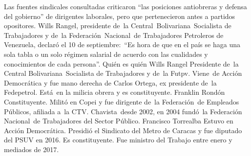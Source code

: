 \documentclass{article}%
\begin{document}
\newline%
%
Las fuentes sindicales consultadas criticaron “las posiciones antiobreras y defensa del gobierno” de dirigentes laborales, pero que pertenecieron antes a partidos opositores.%
\newline%
%
Wills Rangel, presidente de~la Central~Bolivariana~Socialista de Trabajadores y de~la Federación~Nacional~de Trabajadores Petroleros de Venezuela, declaró el 10 de septiembre:~“Es hora de que en el país se haga una sola tabla o un solo régimen salarial de acuerdo con las cualidades y conocimientos de cada persona”.%
\newline%
%
Quién es quién%
\newline%
%
Wills Rangel%
\newline%
%
Presidente de~la Central Bolivariana~Socialista de Trabajadores y de~la Futpv. Viene~de Acción Democrática y fue mano derecha de Carlos Ortega, ex presidente de~la Fedepetrol. Está~en la milicia obrera y es constituyente.%
\newline%
%
Franklin Rondón%
\newline%
%
Constituyente. Militó en Copei y fue dirigente de~la Federación~de Empleados Públicos, afiliada a~la CTV. Chavista~desde 2002, en 2004 fundó~la Federación Nacional~de Trabajadores del Sector Público.%
\newline%
%
Francisco Torrealba%
\newline%
%
Estuvo en Acción Democrática. Presidió el Sindicato del Metro de Caracas y fue diputado del PSUV en 2016. Es constituyente. Fue ministro del Trabajo entre enero y mediados de 2017.%
\newline%
%
\end{document}
